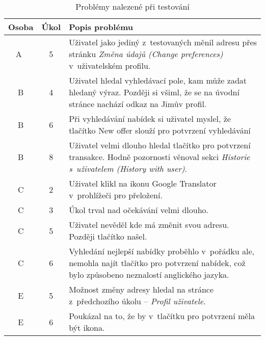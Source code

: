 \begin{table}[h]
    \caption{Problémy nalezené při testování}\label{tab:test-results}
    \begin{tabulary}{1.0\textwidth}{|c|c|L|}
        \hline
        \textbf{Osoba} & \textbf{Úkol} & \textbf{Popis problému} \\ \hline\hline
        A~& 5 & Uživatel jako jediný z~testovaných měnil adresu přes stránku \textit{Změna údajů (Change preferences)} v~uživatelském profilu. \\ \hline

        B & 4 & Uživatel hledal vyhledávací pole, kam může zadat hledaný výraz. Později si všiml, že se na úvodní stránce nachází odkaz na Jimův profil. \\ \hline
        B & 6 & Při vyhledávání nabídek si uživatel myslel, že tlačítko New offer slouží pro potvrzení vyhledávání \\ \hline
        B & 8 & Uživatel velmi dlouho hledal tlačítko pro potvrzení transakce. Hodně pozornosti věnoval sekci \textit{Historie s~uživatelem (History with user)}. \\ \hline

        C & 2 & Uživatel klikl na ikonu Google Translator v~prohlížeči pro přeložení.  \\ \hline
        C & 3 & Úkol trval nad očekávání velmi dlouho.  \\ \hline
        C & 5 & Uživatel nevěděl kde má změnit svou adresu. Později tlačítko našel.  \\ \hline
        C & 6 & Vyhledání nejlepší nabídky proběhlo v~pořádku ale, nemohla najít tlačítko pro potvrzení nabídek, což bylo způsobeno neznalostí anglického jazyka. \\ \hline

        E & 5 & Možnost změny adresy hledal na stránce z~předchozího úkolu -- \textit{Profil uživatele}.  \\ \hline
        E & 6 & Poukázal na to, že by v~tlačítku pro potvrzení měla být ikona.  \\ \hline
    \end{tabulary}
\end{table}
